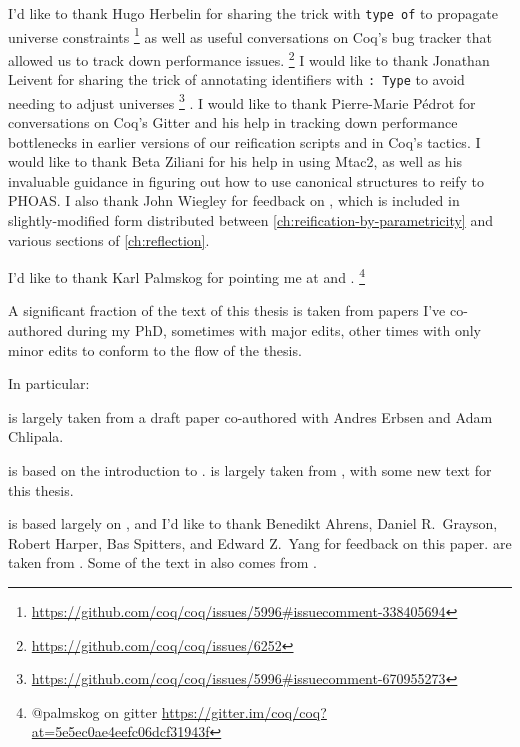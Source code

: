 I'd like to thank Hugo Herbelin for sharing the trick with \texttt{type of} to propagate universe constraints%
\footnote{%
    \url{https://github.com/coq/coq/issues/5996\#issuecomment-338405694}%
}
as well as useful conversations on Coq's bug tracker that allowed us to track down performance issues.%
\footnote{%
    \url{https://github.com/coq/coq/issues/6252}%
}
I would like to thank Jonathan Leivent for sharing the trick of annotating identifiers with \texttt{: Type} to avoid needing to adjust universes%
\footnote{%
  \url{https://github.com/coq/coq/issues/5996\#issuecomment-670955273}
}%
.
I would like to thank Pierre-Marie Pédrot for conversations on Coq's Gitter and his help in tracking down performance bottlenecks in earlier versions of our reification scripts and in Coq's tactics.
I would like to thank Beta Ziliani for his help in using Mtac2, as well as his invaluable guidance in figuring out how to use canonical structures to reify to PHOAS.
I also thank John Wiegley for feedback on , which is included in slightly-modified form distributed between \autoref{ch:reification-by-parametricity} and various sections of \autoref{ch:reflection}.

I'd like to thank Karl Palmskog for pointing me at \textcite{Should1999Lamport} and \textcite{Formalising2018Paulson}.%
\footnote{@palmskog on gitter \url{https://gitter.im/coq/coq?at=5e5ec0ae4eefc06dcf31943f}}


A significant fraction of the text of this thesis is taken from papers I've co-authored during my PhD, sometimes with major edits, other times with only minor edits to conform to the flow of the thesis.

In particular:

 is largely taken from a draft paper co-authored with Andres Erbsen and Adam Chlipala.

 is based on the introduction to .
 is largely taken from , with some new text for this thesis.

 is based largely on , and I'd like to thank Benedikt Ahrens, Daniel R.~Grayson, Robert Harper, Bas Spitters, and Edward Z.~Yang for feedback on this paper.
 are taken from .
Some of the text in  also comes from .

